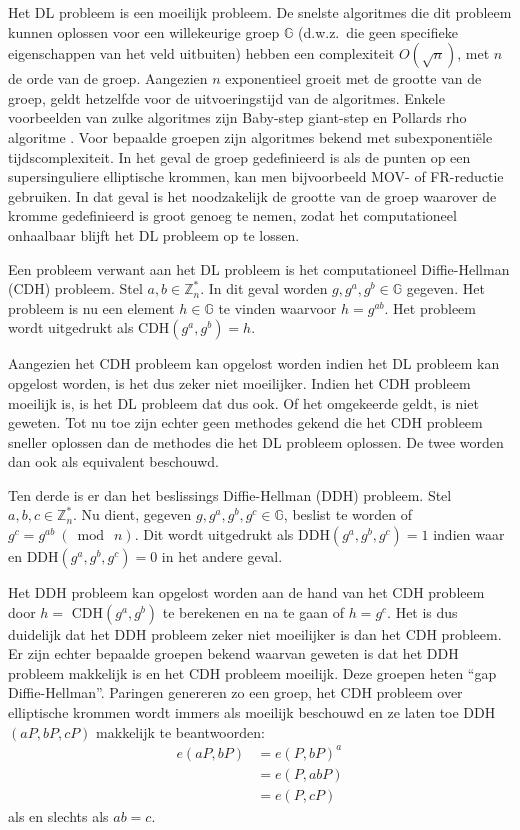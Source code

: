 Het DL probleem is een moeilijk probleem. De snelste algoritmes die dit probleem kunnen oplossen voor een willekeurige groep $\mathbb{G}$ (d.w.z.\ die geen specifieke eigenschappen van het veld uitbuiten) hebben een complexiteit $O(\sqrt{n})$, met $n$ de orde van de groep. Aangezien $n$ exponentieel groeit met de grootte van de groep, geldt hetzelfde voor de uitvoeringstijd van de algoritmes. Enkele voorbeelden van zulke algoritmes zijn Baby-step giant-step \cite{baby-step} en Pollards rho algoritme \cite{pollard-rho}. Voor bepaalde groepen zijn algoritmes bekend met subexponenti\"ele tijdscomplexiteit. In het geval de groep gedefinieerd is als de punten op een supersinguliere elliptische krommen, kan men bijvoorbeeld MOV- \cite{mov} of FR-reductie \cite{ruck} gebruiken. In dat geval is het noodzakelijk de grootte van de groep waarover de kromme gedefinieerd is groot genoeg te nemen, zodat het computationeel onhaalbaar blijft het DL probleem op te lossen.

Een probleem verwant aan het DL probleem is het computationeel Diffie-Hellman (CDH) probleem. Stel $a, b \in \mathbb{Z}^*_n$. In dit geval worden $g, g^a, g^b \in \mathbb{G}$ gegeven. Het probleem is nu een element $h \in \mathbb{G}$ te vinden waarvoor $h = g^{ab}$. Het probleem wordt uitgedrukt als CDH$(g^a, g^b) = h$.

Aangezien het CDH probleem kan opgelost worden indien het DL probleem kan opgelost worden, is het dus zeker niet moeilijker. Indien het CDH probleem moeilijk is, is het DL probleem dat dus ook. Of het omgekeerde geldt, is niet geweten. Tot nu toe zijn echter geen methodes gekend die het CDH probleem sneller oplossen dan de methodes die het DL probleem oplossen. De twee worden dan ook als equivalent beschouwd.

Ten derde is er dan het beslissings Diffie-Hellman (DDH) probleem. Stel $a, b, c \in \mathbb{Z}^*_n$. Nu dient, gegeven $g, g^a, g^b, g^c \in \mathbb{G}$, beslist te worden of $g^c = g^{ab} \: (\bmod \: n)$. Dit wordt uitgedrukt als DDH$(g^a, g^b, g^c) = 1$ indien waar en DDH$(g^a, g^b, g^c) = 0$ in het andere geval.

Het DDH probleem kan opgelost worden aan de hand van het CDH probleem door $h =$ CDH$(g^a, g^b)$ te berekenen en na te gaan of $h = g^c$. Het is dus duidelijk dat het DDH probleem zeker niet moeilijker is dan het CDH probleem. Er zijn echter bepaalde groepen bekend waarvan geweten is dat het DDH probleem makkelijk is en het CDH probleem moeilijk. Deze groepen heten ``gap Diffie-Hellman''. Paringen genereren zo een groep, het CDH probleem over elliptische krommen wordt immers als moeilijk beschouwd en ze laten toe DDH$(aP, bP, cP)$ makkelijk te beantwoorden:
\[\begin{aligned}
e(aP, bP) &= e(P, bP)^a\\
								&= e(P, abP)\\
								&= e(P, cP)
\end{aligned}\]
als en slechts als $ab = c$.

